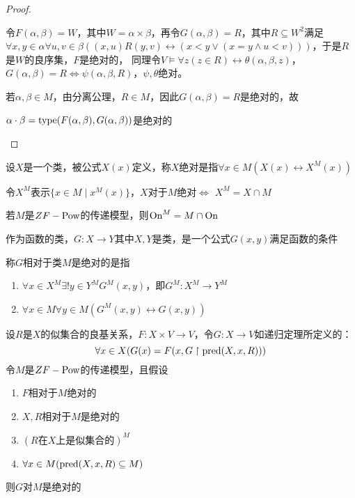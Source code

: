 \documentclass[11pt]{article}
\begin{document}
\begin{proof}
\begin{enumerate}
令\(F(\alpha,\beta)=W\)，其中\(W=\alpha\times\beta\)，再令\(G(\alpha,\beta)=R\)，其中\(R\subseteq W^2\)满足
\(\forall x,y\in\alpha\forall u,v\in\beta((x,u)R(y,v)\leftrightarrow(x<y\vee(x=y\wedge u<v)))\)，于是\(R\)是\(W\)的良序集，\(F\)是绝对的，
同理令\(V\vDash\forall z(z\in R)\leftrightarrow\theta(\alpha,\beta,z)\)，\(G(\alpha,\beta)=R\Leftrightarrow\psi(\alpha,\beta,R)\)，\(\psi,\theta\)绝对。

若\(\alpha,\beta\in M\)，由分离公理，\(R\in M\)，因此\(G(\alpha,\beta)=R\)是绝对的，故

\(\alpha\cdot\beta=\operatorname{type}(F(\alpha,\beta),G(\alpha,\beta))\)是绝对的
\end{enumerate}
\end{proof}

设\(X\)是一个类，被公式\(X(x)\)定义，称\(X\)绝对是指\(\forall x\in M(X(x)\leftrightarrow X^M(x))\)

令\(X^M\)表示\(\{x\in M\mid x^M(x)\}\)，\(X\)对于\(M\)绝对\(\Leftrightarrow\) \(X^M=X\cap M\)

若\(M\)是\(ZF-\operatorname{Pow}\)的传递模型，则\(\operatorname{On}^M=M\cap\operatorname{On}\)

作为函数的类，\(G:X\to Y\)其中\(X,Y\)是类，是一个公式\(G(x,y)\)满足函数的条件

称\(G\)相对于类\(M\)是绝对的是指
\begin{enumerate}
\item \(\forall x\in X^M\exists!y\in Y^MG^M(x,y)\)，即\(G^M:X^M\to Y^M\)
\item \(\forall x\in M\forall y\in M(G^M(x,y)\leftrightarrow G(x,y))\)
\end{enumerate}


\begin{theorem}[]
设\(R\)是\(X\)的似集合的良基关系，\(F:X\times V\to V\)，令\(G:X\to V\)如递归定理所定义的：
\begin{equation*}
\forall x\in X(G(x)=F(x,G\upharpoonright\text{pred}(X,x,R)))
\end{equation*}
令\(M\)是\(ZF-\operatorname{Pow}\)的传递模型，且假设
\begin{enumerate}
\item \(F\)相对于\(M\)绝对的
\item \(X,R\)相对于\(M\)是绝对的
\item \((R\text{在$X$上是似集合的})^M\)
\item \(\forall x\in M(\text{pred}(X,x,R)\subseteq M)\)
\end{enumerate}
则\(G\)对\(M\)是绝对的
\end{theorem}
\end{document}
